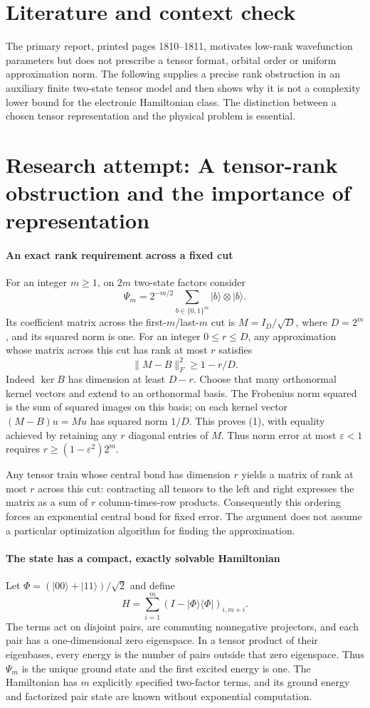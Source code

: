 \documentclass[11pt]{article}
\begin{document}
\section{Literature and context check}
The primary report, printed pages 1810--1811, motivates low-rank wavefunction parameters but does not prescribe a tensor format, orbital order or uniform approximation norm. The following supplies a precise rank obstruction in an auxiliary finite two-state tensor model and then shows why it is not a complexity lower bound for the electronic Hamiltonian class. The distinction between a chosen tensor representation and the physical problem is essential.
\section{Research attempt: A tensor-rank obstruction and the importance of representation}

\paragraph{An exact rank requirement across a fixed cut}
For an integer $m\geq1$, on $2m$ two-state factors consider
\[
 \Psi_m=2^{-m/2}\sum_{b\in\{0,1\}^m}|b\rangle\otimes|b\rangle.
\]
Its coefficient matrix across the first-$m$/last-$m$ cut is $M=I_D/\sqrt D$, where $D=2^m$, and its squared norm is one. For an integer $0\leq r\leq D$, any approximation whose matrix across this cut has rank at most $r$ satisfies
\[
 \lVert M-B\rVert_F^2\geq1-r/D.
 \tag{1}
\]
Indeed $\ker B$ has dimension at least $D-r$. Choose that many orthonormal kernel vectors and extend to an orthonormal basis. The Frobenius norm squared is the sum of squared images on this basis; on each kernel vector $(M-B)u=Mu$ has squared norm $1/D$. This proves (1), with equality achieved by retaining any $r$ diagonal entries of $M$. Thus norm error at most $\varepsilon<1$ requires $r\geq(1-\varepsilon^2)2^m$.

Any tensor train whose central bond has dimension $r$ yields a matrix of rank at most $r$ across this cut: contracting all tensors to the left and right expresses the matrix as a sum of $r$ column-times-row products. Consequently this ordering forces an exponential central bond for fixed error. The argument does not assume a particular optimization algorithm for finding the approximation.

\paragraph{The state has a compact, exactly solvable Hamiltonian}
Let $\Phi=(|00\rangle+|11\rangle)/\sqrt2$ and define
\[
 H=\sum_{i=1}^m\left(I-|\Phi\rangle\langle\Phi|\right)_{i,m+i}.
\]
The terms act on disjoint pairs, are commuting nonnegative projectors, and each pair has a one-dimensional zero eigenspace. In a tensor product of their eigenbases, every energy is the number of pairs outside that zero eigenspace. Thus $\Psi_m$ is the unique ground state and the first excited energy is one. The Hamiltonian has $m$ explicitly specified two-factor terms, and its ground energy and factorized pair state are known without exponential computation.
\end{document}
